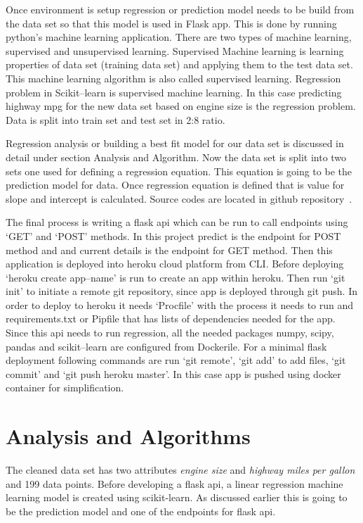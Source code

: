  Once environment is setup regression or prediction model needs to be build
 from the data set so that this model is used in Flask app. This is done by
 running python's machine learning application. There are two types of
 machine learning, supervised and unsupervised learning. Supervised
 Machine learning is learning properties of data set (training data set)
 and applying them to the test data set. This machine learning algorithm
 is also called supervised learning. Regression problem in Scikit--learn
 is supervised machine learning. In this case predicting highway mpg for
 the new data set based on engine size is the regression problem. Data
 is split into train set and test set in 2:8 ratio.
    
 Regression analysis or building a best fit model for our data set is
 discussed in detail under section Analysis and Algorithm. Now the data
 set is split into two sets one used for defining a regression 
 equation. This equation is going to be the prediction model for data.
 Once regression equation is defined
 that is value for slope and intercept is calculated.   
 Source codes are located in github repository~\cite{hid-sp18-415-regression}.
   
The final process is writing a flask api which can be run to call 
endpoints using `GET' and `POST' methods. In this project predict is the
endpoint for POST method and and current details is the endpoint for GET
method. Then this application is deployed into heroku cloud platform from
CLI. Before deploying `heroku create app--name' is run to create an app within
heroku. Then run `git init' to initiate a remote git repository, since app is 
deployed through git push. In order to deploy to heroku it needs `Procfile'
with the process it needs to run and requirements.txt or Pipfile that has lists 
of dependencies needed for the app. Since this api needs to run regression, all
the needed packages numpy, scipy, pandas and scikit--learn are configured from 
Dockerile. For a minimal flask deployment following commands are run 
`git remote', `git add' to add files, `git commit' and `git push heroku master'.
In this case app is pushed using docker container for simplification.    

\section{Analysis and Algorithms}

 The cleaned data set has two attributes \textit{engine size} and
 \textit{highway miles per gallon} and 199 data points. Before developing
 a flask api, a linear regression machine learning model is created using
 scikit-learn. As discussed earlier this is going to be the prediction model
 and one of the endpoints for flask api.


